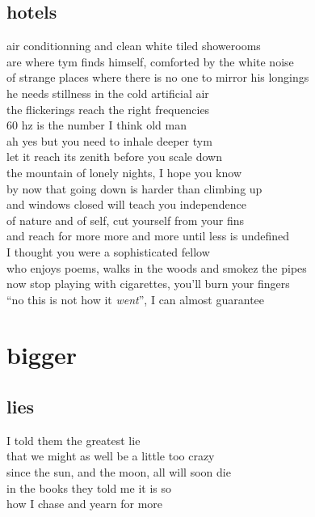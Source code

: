 \documentclass{article}
\begin{document}
\subsection{hotels}

air conditionning and clean white tiled showerooms\\
are where tym finds himself, comforted by the white noise\\
of strange places where there is no one to mirror his longings\\
he needs stillness in the cold artificial air\\
the flickerings reach the right frequencies\\
60 hz is the number I think old man\\
ah yes but you need to inhale deeper tym\\

let it reach its zenith before you scale down\\
the mountain of lonely nights, I hope you know\\
by now that going down is harder than climbing up\\
and windows closed will teach you independence\\
of nature and of self, cut yourself from your fins\\
and reach for more more and more until less is undefined\\


I thought you were a sophisticated fellow\\
who enjoys poems, walks in the woods and smokez the pipes\\
now stop playing with cigarettes, you'll burn your fingers\\
``no this is not how it \textit{went}'', I can almost guarantee\\
\clearpage

\section{bigger}
\subsection{lies}

I told them the greatest lie\\
that we might as well be a little too crazy\\
since the sun, and the moon, all will soon die\\
in the books they told me it is so\\
how I chase and yearn for more\\
\end{document}
